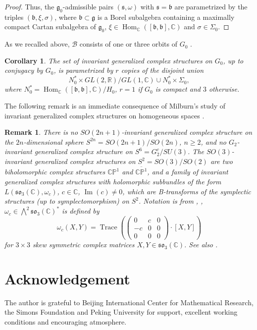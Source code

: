 \documentclass[10pt]{article}
\newtheorem{corollary}[theorem]{Corollary}
\newtheorem{remark}[theorem]{Remark}
\begin{document}
\begin{proof}
Thus, the $\mathfrak{g}_0$-admissible pairs $(\mathfrak{s},\omega )$ with $\mathfrak{s}=\mathfrak{b}$ are parametrized by the triples $(\mathfrak{b},\xi , \sigma)$, where $\mathfrak{b}\subset \mathfrak{g}$ is a Borel subalgebra containing a maximally compact Cartan subalgebra of $\mathfrak{g}_0$, $\xi \in \operatorname{Hom}_{\mathbb C}([\mathfrak{b},\mathfrak{b}],\mathbb C)$ and $\sigma \in {\Sigma}_0$.

\end{proof}

As we recalled above, $\mathcal{B}$ consists of one or three orbits of $G_0$ \cite{Wolf}.

\begin{corollary}
The set of invariant generalized complex structures on $G_0$, up to conjugacy by $G_0$, is parametrized by $r$ copies of the disjoint union
$$
N_0^{*}\times GL(2,\mathbb R)/GL(1,\mathbb C)\cup N_0^{*}\times {\Sigma}_0,
$$
where $N_0^{*}=\operatorname{Hom}_{\mathbb C}([\mathfrak{b},\mathfrak{b}],\mathbb C)/H_0$, $r=1$ if $G_0$ is compact and $3$ otherwise.
\end{corollary}

The following remark is an immediate consequence of Milburn's study of invariant generalized complex structures on homogeneous spaces \cite{Milburn}.

\begin{remark}
There is no $SO(2n+1)$-invariant generalized complex structure on the $2n$-dimensional sphere $S^{2n}=SO(2n+1)/SO(2n)$, $n\geq 2$, and no $G_2$-invariant generalized complex structure on $S^{6}=G_2^c/SU(3)$. The $SO(3)$-invariant generalized complex structures on $S^{2}=SO(3)/SO(2)$ are two biholomorphic complex structures $\mathbb C \mathbb P ^1$ and $\overline{\mathbb C \mathbb P ^1}$, and a family of invariant generalized complex structures with holomorphic subbundles of the form $L(\mathfrak{so}_{3}(\mathbb C), {\omega}_c)$, $c\in \mathbb C$, $\operatorname{Im} (c)\neq 0$, which are B-transforms of the symplectic structures (up to symplectomorphism) on $S^2$. Notation is from \cite{Gualtieri}, \cite{Milburn}, ${\omega}_c \in \bigwedge ^2 {\mathfrak{so}_{3}(\mathbb C)}^{*}$ is defined by 
$$
{\omega}_c (X,Y)=\operatorname{Trace}(\begin{pmatrix} 0 & c & 0 \\ -c & 0 & 0 \\ 0 & 0 & 0 \end{pmatrix}\cdot [X,Y])
$$
for $3\times 3$ skew symmetric complex matrices $X, Y \in \mathfrak{so}_3(\mathbb C)$. See also \cite{Hitchin}.
\end{remark}

\section*{Acknowledgement}

The author is grateful to Beijing International Center for Mathematical Research, the Simons Foundation and Peking University for support, excellent working conditions and encouraging atmosphere.\\





\end{document}
